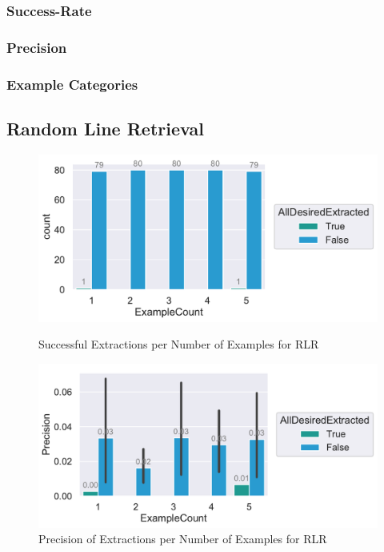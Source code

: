 \documentclass[\myrootdir/main.tex]{subfiles}
\begin{document}
\subsubsection{Success-Rate}
\subsubsection{Precision}
\subsubsection{Example Categories}


\subsection{Random Line Retrieval}

\begin{figure}[htbp]
	\centering
	\begin{minipage}{0.45\textwidth}
		\centering
		\includegraphics[width=\textwidth, clip]{img/big-study/success-examples-rn.pdf}
		\caption{Successful Extractions per Number of Examples for RLR}
		\label{fig:success-examples-rn}
	\end{minipage}\hfill
	\begin{minipage}{0.45\textwidth}
		\centering
		\includegraphics[width=\textwidth, clip]{img/big-study/precision-rn.pdf}
		\caption{Precision of Extractions per Number of Examples for RLR}
		\label{fig:precision-rn}
	\end{minipage}
\end{figure}
\end{document}
